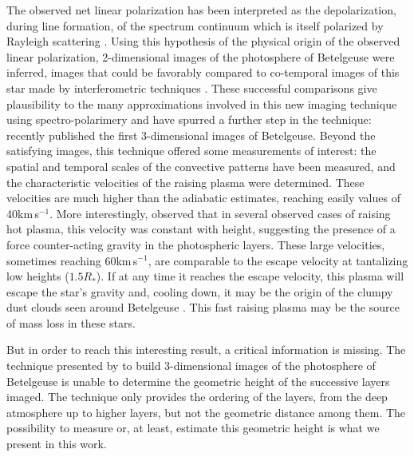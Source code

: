 \documentclass{/Users/art2/TeX/aanda/aa}
\def\kms {km\,s$^{-1}$}
\begin{document}
The observed net  linear polarization has been interpreted as the depolarization, during line formation, of the spectrum continuum which is itself polarized by Rayleigh scattering \citep{Auriere_2016}. Using this hypothesis of the physical origin of the observed linear polarization, 2-dimensional images of the photosphere of Betelgeuse were inferred, images that could be favorably compared to co-temporal images of this star made by interferometric techniques \citep{LA18}. These successful comparisons give plausibility to the many approximations involved in this new imaging technique using spectro-polarimery and have spurred a further step in the technique: recently \cite{LA22} published the first  3-dimensional images of Betelgeuse.  Beyond the satisfying images, this technique offered some measurements of interest: the spatial and temporal scales of the convective patterns have been measured, and the characteristic velocities of the raising plasma were determined. These velocities are much higher than the adiabatic estimates, reaching easily values of 40\kms \citep{LA18,stothers_giant_2010}. More interestingly, \cite{LA22} observed that in  several observed cases of raising hot plasma, this velocity was constant with height, suggesting the presence of a force counter-acting gravity in the photospheric layers. These large velocities, sometimes reaching 60\kms, are comparable to the escape velocity at tantalizing low heights ($1.5 R_*$). If at any time it reaches the escape velocity, this plasma will escape the star's gravity and, cooling down, it may be the origin of the clumpy dust clouds seen around Betelgeuse \citep{montarges_dimming_2021}. This fast raising plasma may be the source of mass loss in these stars. 

But in order to reach this interesting result, a critical information is missing. The technique presented by \cite{LA22} to build 3-dimensional images of the photosphere of Betelgeuse is unable to determine the geometric height of the successive layers imaged. The technique only provides the ordering of the layers, from the deep atmosphere up to higher layers, but not the geometric distance among them. The possibility to measure or, at least, estimate this geometric height is what we present in this work. 
\end{document}
